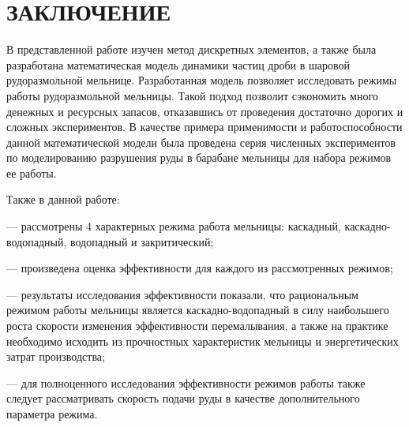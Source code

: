 \documentclass[utf8x, 14pt, oneside, a4paper]{article}
\begin{document}
		\pagebreak
		
	\section*{ЗАКЛЮЧЕНИЕ}

В представленной работе изучен метод дискретных элементов, а также была разработана математическая модель динамики частиц дроби в шаровой рудоразмольной мельнице.
Разработанная модель позволяет исследовать режимы работы рудоразмольной мельницы.
Такой подход позволит сэкономить много денежных и ресурсных запасов, отказавшись от проведения достаточно дорогих и сложных экспериментов.
В качестве примера применимости и работоспособности данной математической модели была проведена серия численных экспериментов по моделированию разрушения руды в барабане мельницы для набора режимов ее работы.

Также в данной работе:

	--- рассмотрены 4 характерных режима работа мельницы: каскадный, каскадно-водопадный, водопадный и закритический;

	--- произведена оценка эффективности для каждого из рассмотренных режимов;

	--- результаты исследования эффективности показали, что рациональным режимом работы мельницы является каскадно-водопадный в силу наибольшего роста скорости изменения эффективности перемалывания, а также на практике необходимо исходить из прочностных характеристик мельницы и энергетических затрат производства;
	
	--- для полноценного исследования эффективности режимов работы также следует рассматривать скорость подачи руды в качестве дополнительного параметра режима.

	
		\pagebreak
\end{document}
